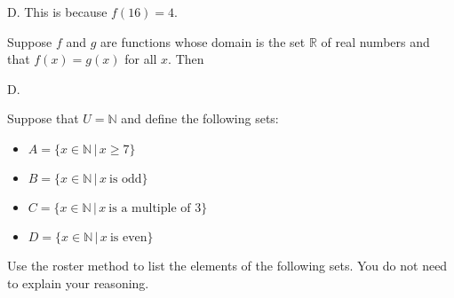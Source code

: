 \documentclass[addpoints]{exam}
\begin{document}
\begin{questions}
	\begin{solution}
		D. This is because $f(16) = 4$. 
	\end{solution}


\question[2] Suppose $f$ and $g$ are functions whose domain is the set $\mathbb{R}$ of real numbers and that $f(x) = g(x)$ for all $x$. Then 

\begin{solution}
	D. 
\end{solution}


\question Suppose that $U = \mathbb{N}$ and define the following sets: 
\begin{itemize}
	\item $A = \{ x \in \mathbb{N} \, | \, x \geq 7 \}$
	\item $B = \{ x \in \mathbb{N} \, | \, x \ \text{is odd} \}$
	\item $C = \{ x \in \mathbb{N} \, | \, x \ \text{is a multiple of 3} \}$
	\item $D = \{ x \in \mathbb{N} \, | \, x \ \text{is even} \}$

\end{itemize}
Use the roster method to list the elements of the following sets. You do not need to explain your reasoning. 

\end{questions}
\end{document}
